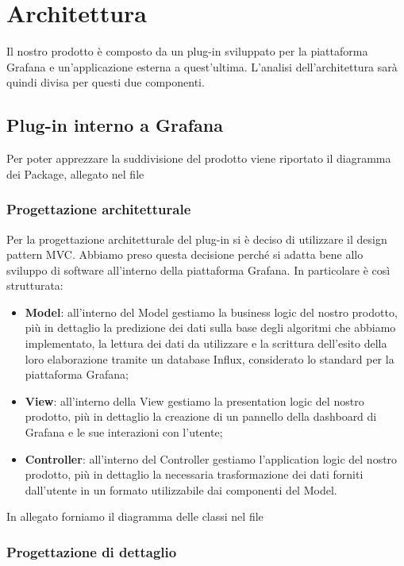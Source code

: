 \section{Architettura}
	Il nostro prodotto è composto da un plug-in sviluppato per la piattaforma Grafana e un'applicazione esterna a quest'ultima. L'analisi dell'architettura sarà quindi divisa per questi due componenti.
	\subsection{Plug-in interno a Grafana}
		Per poter apprezzare la suddivisione del prodotto viene riportato il diagramma dei Package, allegato nel file %
		\subsubsection{Progettazione architetturale}
		Per la progettazione architetturale del plug-in si è deciso di utilizzare il design pattern MVC. Abbiamo preso questa decisione perché si adatta bene allo sviluppo di software all'interno della piattaforma Grafana. In particolare è così strutturata:
		\begin{itemize}
			\item \textbf{Model}: all'interno del Model gestiamo la business logic del nostro prodotto, più in dettaglio la predizione dei dati sulla base degli algoritmi che abbiamo implementato, la lettura dei dati da utilizzare e la scrittura dell'esito della loro elaborazione tramite un database Influx, considerato lo standard per la piattaforma Grafana;
			\item \textbf{View}: all'interno della View gestiamo la presentation logic del nostro prodotto, più in dettaglio la creazione di un pannello della dashboard di Grafana e le sue interazioni con l'utente;
			\item \textbf{Controller}: all'interno del Controller gestiamo l'application logic del nostro prodotto, più in dettaglio la necessaria trasformazione dei dati forniti dall'utente in un formato utilizzabile dai componenti del Model.
		\end{itemize}
		In allegato forniamo il diagramma delle classi nel file %
		\subsubsection{Progettazione di dettaglio}
